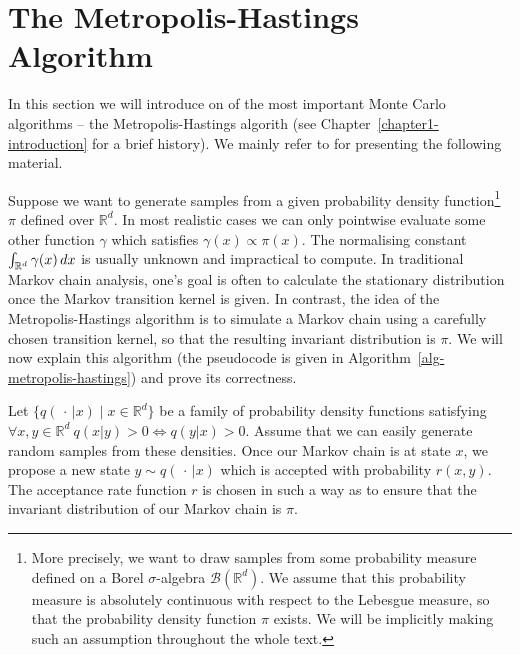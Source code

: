 \documentclass[report.tex]{subfiles}
\begin{document}
\chapter{The Metropolis-Hastings Algorithm}
\label{appendix-metropolis-hastings}

In this section we will introduce on of the most important Monte Carlo
algorithms -- the Metropolis-Hastings algorith (see Chapter~\ref{chapter1-introduction}
for a brief history).
We mainly refer to \cite{liu2008monte} for presenting the following material.

Suppose we want to generate samples from a given probability density function\footnote{
  More precisely, we want to draw samples from some probability measure
  defined on a Borel $\sigma$-algebra $\mathcal{B}(\mathbb{R}^{d})$. We assume
  that this probability measure is absolutely continuous with respect to the
  Lebesgue measure, so that the probability density function $\pi$ exists.
  We will be implicitly making such an assumption throughout the whole text.
}
$\pi$ defined over $\mathbb{R}^{d}$. In most
realistic cases we can only pointwise evaluate some other function $\gamma$ which
satisfies $\gamma(x) \propto \pi(x)$.
The normalising constant
$\int_{{\mathbb{R}^{d}}}^{{}} {\gamma(x)}\, d{x}$ is usually unknown and impractical
to compute.
In traditional Markov chain analysis, one's goal is often to calculate
the stationary distribution once the Markov transition kernel is given.
In contrast, the idea of the Metropolis-Hastings algorithm is to
simulate a Markov chain using a carefully chosen transition kernel,
so that the resulting invariant distribution is $\pi$.
We will now explain this algorithm
(the pseudocode is given in Algorithm~\ref{alg-metropolis-hastings})
and prove its correctness.

Let $\{q(\,\cdot\, \vert x) \mid x \in \mathbb{R}^d\}$
be a family of probability density functions satisfying
$\forall x,y \in \mathbb{R}^{d}\ q(x \vert y) > 0 \Leftrightarrow q(y \vert x) > 0$.
Assume that we can easily generate random samples from these densities.
Once our Markov chain is at state $x$, we propose a new state
$y \sim q(\,\cdot\, \vert x)$ which is accepted with probability
$r(x, y)$. The acceptance rate function $r$ is chosen in such a way as to
ensure that the invariant distribution of our Markov chain is $\pi$.
\end{document}
